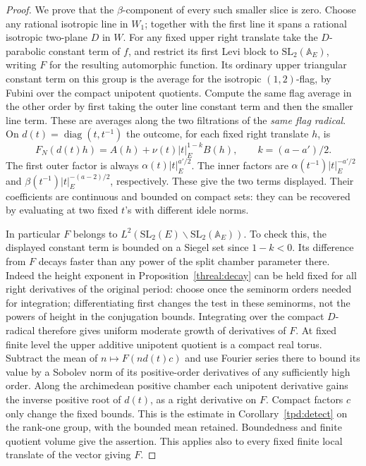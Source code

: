 \begin{proof}
We prove that the \(\beta\)-component of every such smaller
slice is zero. Choose any rational isotropic line in \(W_1\);
together with the first line it spans a rational isotropic
two-plane \(D\) in \(W\). For any fixed upper right translate
take the \(D\)-parabolic constant term of \(f\), and restrict its
first Levi block to \(\mathrm{SL}_2(\mathbb A_E)\), writing \(F\)
for the resulting automorphic function. Its ordinary upper
triangular constant term on this group is the average for the
isotropic \((1,2)\)-flag, by Fubini over the compact unipotent
quotients. Compute the same flag average in the other order by
first taking the outer line constant term and then the smaller
line term. These are averages along the two filtrations of the
\emph{same flag radical}. On \(d(t)=\operatorname{diag}(t,t^{-1})\)
the outcome, for each fixed right translate \(h\), is
\[
              F_N(d(t)h)=A(h)+\nu(t)|t|_E^{1-k} B(h),
                 \qquad k=(a-a')/2.
\]
The first outer factor is always \(\alpha(t)|t|_E^{a'/2}\).
The inner factors are \(\alpha(t^{-1})|t|_E^{-a'/2}\) and
\(\beta(t^{-1})|t|_E^{-(a-2)/2}\), respectively. These give
the two terms displayed. Their coefficients are continuous and
bounded on compact sets: they can be recovered by evaluating at
two fixed \(t\)'s with different idele norms.

In particular \(F\) belongs to
\(L^2(\mathrm{SL}_2(E)\backslash\mathrm{SL}_2(\mathbb A_E))\).
To check this, the displayed constant term is bounded on a Siegel
set since \(1-k<0\). Its difference from \(F\) decays faster than
any power of the split chamber parameter there. Indeed the
height exponent in Proposition~\ref{threal:decay} can be held fixed
for all right derivatives of the original period: choose once
the seminorm orders needed for integration; differentiating first
changes the test in these seminorms, not the powers of height in
the conjugation bounds. Integrating over the compact \(D\)-radical
therefore gives uniform moderate growth of derivatives of \(F\).
At fixed finite level the upper additive unipotent quotient is a
compact real torus. Subtract the mean of \(n\mapsto F(n d(t)c)\)
and use Fourier series there to bound its value by a Sobolev norm
of its positive-order derivatives of any sufficiently high order.
Along the archimedean positive chamber each unipotent derivative
gains the inverse positive root of \(d(t)\), as a right derivative
on \(F\). Compact factors \(c\) only change the fixed bounds. This
is the estimate in Corollary~\ref{tpd:detect} on the rank-one
group, with the bounded mean retained. Boundedness and finite
quotient volume give the assertion. This applies also to every
fixed finite local translate of the vector giving \(F\).


\end{proof}
